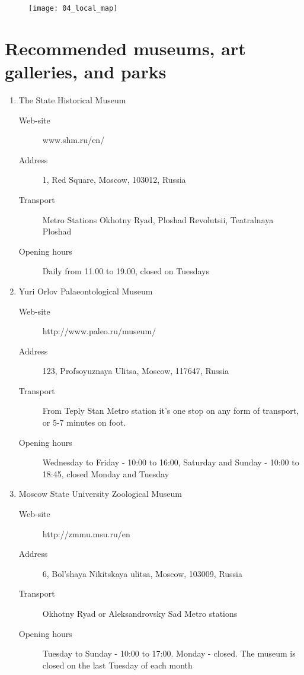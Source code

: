 \documentclass[10pt,fleqn,openany]{book} %
\begin{document}
\begin{figure}[H]
	\begin{center}
		\texttt{[image: 04\_local\_map]}
	\end{center}
\end{figure}

\section{Recommended museums, art galleries, and parks}

\begin{enumerate}
	\item The State Historical Museum
		\begin{description}
			\item[Web-site] www.shm.ru/en/
			\item[Address] 1, Red Square, Moscow, 103012, Russia 
			\item[Transport] Metro Stations Okhotny Ryad, Ploshad Revolutsii, Teatralnaya Ploshad
			\item[Opening hours] Daily from 11.00 to 19.00, closed on Tuesdays
		\end{description}

	\item 	Yuri Orlov Palaeontological Museum
		\begin{description}
			\item[Web-site] http://www.paleo.ru/museum/ 
			\item[Address] 123, Profsoyuznaya Ulitsa, Moscow, 117647, Russia 
			\item[Transport] From Teply Stan Metro station it's one stop on any form of transport, or 5-7 minutes on foot.
			\item[Opening hours] Wednesday to Friday - 10:00 to 16:00, Saturday and Sunday - 10:00 to 18:45, closed Monday and Tuesday
		\end{description}

	\item Moscow State University Zoological Museum
		\begin{description}
			\item[Web-site] http://zmmu.msu.ru/en
			\item[Address] 6, Bol'shaya Nikitskaya ulitsa, Moscow, 103009, Russia 
			\item[Transport] Okhotny Ryad or Aleksandrovsky Sad Metro stations
			\item[Opening hours] Tuesday to Sunday - 10:00 to 17:00. Monday - closed. The museum is closed on the last Tuesday of each month
		\end{description}


\end{enumerate}
\end{document}

